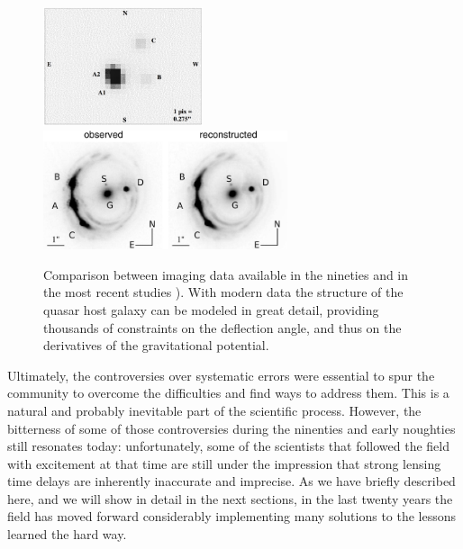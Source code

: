 \begin{figure}
\includegraphics[height=3.5cm]{figures/pg1115_blowup.png}
\includegraphics[height=3.5cm]{figures/Suyu14_fig1.jpg}
\caption{Comparison between imaging data available in the nineties
\citep[left panel, from][]{Sch++97} and in the most recent studies
\citep[middle and right panels, from][]{Suy++14}). With modern data the
structure of the quasar host galaxy can be modeled in great detail,
providing thousands of constraints on the deflection angle, and thus on
the derivatives of the gravitational potential.}
\label{fig:oldvsmodernimage}
\end{figure}

Ultimately, the controversies over systematic errors were essential to
spur the community to overcome the difficulties and find ways to
address them. This is a natural and probably inevitable part of the
scientific process. However, the bitterness of some of those
controversies during the ninenties and early noughties still resonates
today: unfortunately, some of the scientists that followed the field
with excitement at that time are still under the impression that
strong lensing time delays are inherently inaccurate and imprecise. As
we have briefly described here, and we will show in detail in the
next sections, in the last twenty years the field has moved forward
considerably implementing many solutions to the lessons learned the
hard way.
